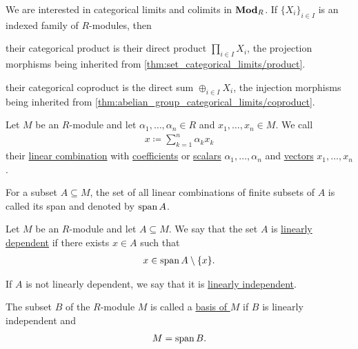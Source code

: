 \begin{proposition}\label{thm:module_categorical_limits}
  We are interested in categorical limits and colimits in $\operatorname{\mathbf{Mod}}_R$. If $\{ X_i \}_{i \in I}$ is an indexed family of $R$-modules, then
  \begin{defenum}
    \item\label{thm:module_categorical_limits/product} their categorical product is their direct product $\prod_{i \in I} X_i$, the projection morphisms being inherited from \cref{thm:set_categorical_limits/product}.

    \item\label{thm:module_categorical_limits/coproduct} their categorical coproduct is the direct sum $\oplus_{i \in I} X_i$, the injection morphisms being inherited from \cref{thm:abelian_group_categorical_limits/coproduct}.
  \end{defenum}
\end{proposition}

\begin{definition}\label{def:linear_combination}
  Let $M$ be an $R$-module and let $\alpha_1, \ldots, \alpha_n \in R$ and $x_1, \ldots, x_n \in M$. We call
  \begin{align*}
    x \coloneqq \sum_{k=1}^n \alpha_k x_k
  \end{align*}
  their \uline{linear combination} with \uline{coefficients} or \uline{scalars} $\alpha_1, \ldots, \alpha_n$ and \uline{vectors} $x_1, \ldots, x_n$.

  For a subset $A \subseteq M$, the set of all linear combinations of finite subsets of $A$ is called its span and denoted by $\operatorname{span}{A}$.
\end{definition}

\begin{definition}\label{def:linear_dependence}
  Let $M$ be an $R$-module and let $A \subseteq M$. We say that the set $A$ is \uline{linearly dependent} if there exists $x \in A$ such that
  \begin{align*}
    x \in \operatorname{span}{A} \setminus \{ x \}.
  \end{align*}

  If $A$ is not linearly dependent, we say that it is \uline{linearly independent}.
\end{definition}

\begin{definition}\label{def:module_basis}
  The subset $B$ of the $R$-module $M$ is called a \uline{basis of $M$} if $B$ is linearly independent and
  \begin{align*}
    M = \operatorname{span}{B}.
  \end{align*}
\end{definition}

